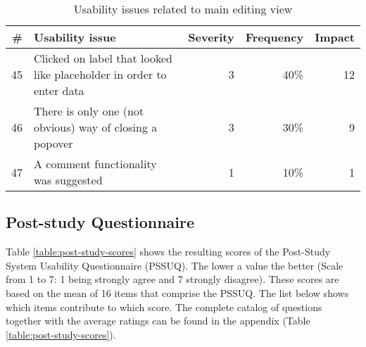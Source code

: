 
\begin{table}[h!]
\centering
\begin{tabular}{|r|p{7cm}|r|r|r|}
\hline
\rowcolor[HTML]{EFEFEF}
{\bf \#} & {\bf Usability issue} & {\bf Severity} & {\bf Frequency} & {\bf Impact} \\ \hline
45 & Clicked on label that looked like placeholder in order to enter data & 3 & 40\% & 12 \\ \hline
46 & There is only one (not obvious) way of closing a popover & 3 & 30\% & 9 \\ \hline
47 & A comment functionality was suggested & 1 & 10\% & 1 \\ \hline
\end{tabular}
\caption{Usability issues related to main editing view}
\label{table:issues-main-editing-view}
\end{table}



\subsection{Post-study Questionnaire}
Table \ref{table:post-study-scores} shows the resulting  scores of the Post-Study System Usability Questionnaire (PSSUQ). The lower a value the better (Scale from 1 to 7: 1 being strongly agree and 7 strongly disagree). These scores are based on the mean of 16 items that comprise the PSSUQ. The list below shows which items contribute to which score. The
complete catalog of questions together with the average ratings can be found in the appendix (Table \ref{table:post-study-scores}).


